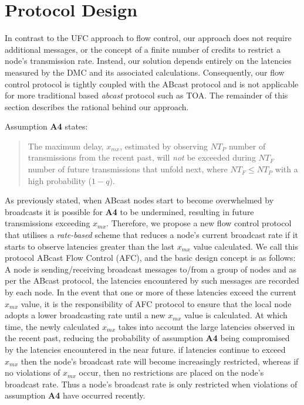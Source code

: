 \section{Protocol Design}
    In contrast to the \textsf{UFC} approach to flow control, our approach does not require additional messages, or the concept of a finite number of credits to restrict a node's transmission rate.  Instead, our solution depends entirely on the latencies measured by the DMC and its associated calculations.  Consequently, our flow control protocol is tightly coupled with the \textsf{ABcast} protocol and is not applicable for more traditional based \emph{abcast} protocol such as TOA.  The remainder of this section describes the rational behind our approach.  
    
    Assumption \textbf{A4} states:
    
    \begin{quotation}
            The maximum delay, $x_{mx}$, estimated by observing $NT_P$ number of transmissions from the recent past, will \emph{not} be exceeded during $NT_F$ number of future transmissions that unfold next, where $NT_F \leq NT_P$ with a high probability ($1 - q$).
        \end{quotation}
    
    As previously stated, when \textsf{ABcast} nodes start to become overwhelmed by broadcasts it is possible for \textbf{A4} to be undermined, resulting in future transmissions exceeding $x_{mx}$.  Therefore, we propose a new flow control protocol that utilises a \emph{rate-based} scheme \citep{bertsekas1992DataNetworksFC} that reduces a node's current broadcast rate if it starts to observe latencies greater than the last $x_{mx}$ value calculated.  We call this protocol ABcast Flow Control (AFC), and the basic design concept is as follows: A node is sending/receiving broadcast messages to/from a group of nodes and as per the \textsf{ABcast} protocol, the latencies encountered by such messages are recorded by each node.  In the event that one or more of these latencies exceed the current $x_{mx}$ value, it is the responsibility of AFC protocol to ensure that the local node adopts a lower broadcasting rate until a new $x_{mx}$ value is calculated.  At which time, the newly calculated $x_{mx}$ takes into account the large latencies observed in the recent past, reducing the probability of assumption \textbf{A4} being compromised by the latencies encountered in the near future.  if latencies continue to exceed $x_{mx}$ then the node's broadcast rate will become increasingly restricted, whereas if no violations of $x_{mx}$ occur, then no restrictions are placed on the node's broadcast rate. Thus a node's broadcast rate is only restricted when violations of assumption \textbf{A4} have occurred recently.  

